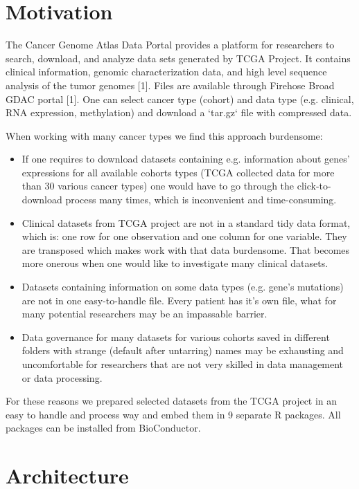 \documentclass{bioinfo}
\begin{document}
\section*{Motivation}
The Cancer Genome Atlas Data Portal provides a platform for researchers to search, download, and analyze data sets generated by TCGA Project. It contains clinical information, genomic characterization data, and high level sequence analysis of the tumor genomes [1]. Files are available through Firehose Broad GDAC portal [1]. One can select cancer type (cohort) and data type (e.g. clinical, RNA expression, methylation) and download a `tar.gz` file with compressed data. 

When working with many cancer types we find this approach burdensome:

\begin{itemize}
\item If one requires to download datasets containing e.g. information about genes' expressions for all available cohorts types (TCGA collected data for more than 30 various cancer types) one would have to go through the click-to-download process many times, which is inconvenient and time-consuming.
\item Clinical datasets from TCGA project are not in a standard tidy data format, which is: one row for one observation and one column for one variable. They are transposed which makes work with that data burdensome. That becomes more onerous when one would like to investigate many clinical datasets.
\item Datasets containing information on some data types (e.g. gene's mutations) are not in one easy-to-handle file. Every patient has it's own file, what for many potential researchers may be an impassable barrier. 
\item Data governance for many datasets for various cohorts saved in different folders with strange (default after untarring) names may be exhausting and uncomfortable for researchers that are not very skilled in data management or data processing.
\end{itemize}
For these reasons we prepared selected datasets from the TCGA project in an easy to handle and process way and embed them in 9 separate R packages. All packages can be installed from BioConductor.

\section*{Architecture}
\end{document}
